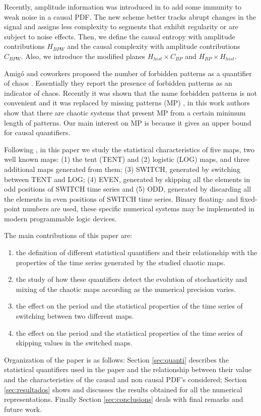 Recently, amplitude information was introduced in \cite{Fadlallah2013} to add some immunity to weak noise in a causal PDF.
The new scheme better tracks abrupt changes in the signal and assigns less complexity to segments that exhibit regularity or are subject to noise effects.
Then, we define the causal entropy with amplitude contributions $H_{BPW}$ and the causal complexity with amplitude contributions $C_{BPW}$.
Also, we introduce the modified planes $H_{hist} \times C_{BP}$ and $H_{BP} \times H_{hist}$.

Amig\'o and coworkers proposed the number of forbidden patterns as a quantifier of chaos \cite{Amigo2007a}.
Essentially they report the presence of forbidden patterns as an indicator of chaos.
Recently it was shown that the name forbidden patterns is not convenient and it was replaced by missing patterns (MP) \cite{Rosso2012}, in this work authors show that there are chaotic systems that present MP from a certain minimum length of patterns.
Our main interest on MP is because it gives an upper bound for causal quantifiers.

Following \cite{Nagaraj2008}, in this paper we study the statistical characteristics of five maps, two well known maps: (1) the tent (TENT) and (2) logistic (LOG) maps, and three additional maps generated from them: (3) SWITCH, generated by switching between TENT and LOG; (4) EVEN, generated by skipping all the elements in odd positions of SWITCH time series and (5) ODD, generated by discarding all the elements in even positions of SWITCH time series.
Binary floating- and fixed-point numbers are used, these specific numerical systems may be implemented in modern programmable logic devices.

The main contributions of this paper are:
\begin{enumerate}
\item the definition of different statistical quantifiers and their relationship with the properties of the time series generated by the studied chaotic maps.
\item the study of how these quantifiers detect the evolution of stochasticity and mixing of the chaotic maps according as the numerical precision varies.
\item the effect on the period and the statistical properties of the time series of switching between two different maps.
\item the effect on the period and the statistical properties of the time series of skipping values in the switched maps.
\end{enumerate}

Organization of the paper is as follows:
Section \ref{sec:quanti} describes the statistical quantifiers used in the paper and the relationship between their value and the characteristics of the causal and non causal PDF's considered;
Section \ref{sec:resultados} shows and discusses the results obtained for all the numerical representations.
Finally Section \ref{sec:conclusions} deals with final remarks and future work.